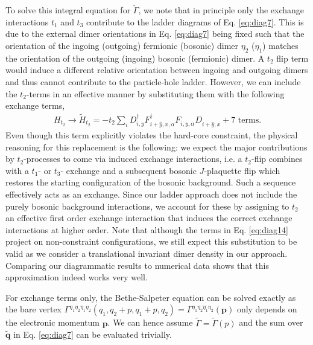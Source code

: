 \documentclass[aps,pra,reprint,showpacs,superscriptaddress]{revtex4-1}
\newcommand{\cre}[2]{{#1}^{\dagger}_{#2}}
\newcommand{\ann}[2]{{#1}^{\phantom{\dagger}}_{#2}}
\newcommand\bs[1]{\ensuremath{\boldsymbol{#1}}}
\begin{document}
To solve this integral equation for $\tilde{\Gamma}$, we note that in principle only the exchange interactions $t_1$ and $t_3$ contribute to the ladder diagrams of Eq. \eqref{eq:diag7}. This is due to the external dimer orientations in Eq. \eqref{eq:diag7} being fixed such that the orientation of the ingoing (outgoing) fermionic (bosonic) dimer $\eta_2$ ($\eta_1$) matches the orientation of the outgoing (ingoing) bosonic (fermionic) dimer. A $t_2$ flip term would induce a different relative orientation between ingoing and outgoing dimers and thus cannot contribute to the particle-hole ladder. However, we can include the $t_2$-terms in an effective manner by substituting them with the following exchange terms,
\begin{align}
H_{t_2}\rightarrow \tilde{H}_{t_2}=-t_2\sum_{i}\cre{D}{i,y}\cre{F}{i+\hat{y},x,\alpha}\ann{F}{i,y,\alpha}\ann{D}{i+\hat{y},x} + \text{7 terms}.\label{eq:diag14}
\end{align}
Even though this term explicitly violates the hard-core constraint, the physical reasoning for this replacement is the following: we expect the major contributions by $t_2$-processes to come via induced exchange interactions, i.e. a $t_2$-flip combines with a $t_1$- or $t_3$- exchange and a subsequent bosonic $J$-plaquette flip which restores the starting configuration of the bosonic background. Such a sequence effectively acts as an exchange. Since our ladder approach does not include the purely bosonic background interactions, we account for these by assigning to $t_2$ an effective first order exchange interaction that induces the correct exchange interactions at higher order. Note that although the terms in Eq. \eqref{eq:diag14} project on non-constraint configurations, we still expect this substitution to be valid as we consider a translational invariant dimer density in our approach. Comparing our diagrammatic results to numerical data shows that this approximation indeed works very well.

For exchange terms only, the Bethe-Salpeter equation can be solved exactly as the bare vertex $\Gamma^{\eta_1\eta_2\eta_1\eta_2}(q_1,q_2+p,q_1+p,q_2)=\Gamma^{\eta_1\eta_2\eta_1\eta_2}(\bs{p})$ only depends on the electronic momentum $\bs{p}$. We can hence assume $\tilde{\Gamma}=\tilde{\Gamma}(p)$ and the sum over $\bs{\tilde{q}}$ in Eq. \eqref{eq:diag7} can be evaluated trivially.
\end{document}
